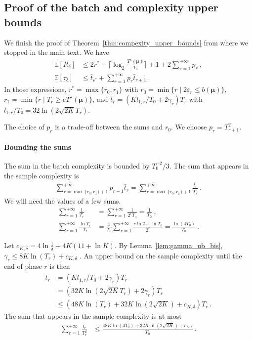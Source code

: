 \subsection{Proof of the batch and complexity upper bounds}

We finish the proof of Theorem~\ref{thm:compexity_upper_bounds} from where we stopped in the main text. We have
\begin{align*}
\mathbb{E}\left[R_\delta\right]
&\le 2r^* - \lceil \log_2 \frac{T^\star(\bm\mu)}{T_0} \rceil + 1 + 2\sum_{r = 1}^{+\infty} p_r
\: , \\
\mathbb{E}\left[\tau_\delta\right]
&\le \bar{t}_{r^*} + \sum_{r = 1}^{+\infty} p_{r} \bar{t}_{r+1}
\: .
\end{align*}
In those expressions, $r^* = \max\{r_0, r_1\}$ with $r_0 = \min\{r \mid 2 \varepsilon_r \le b(\bm\mu)\}$, $r_1 =  \min \{r \mid T_r \ge e T^\star(\bm\mu)\}$, and
$\bar{t}_r = (K l_{1,r}/T_0 + 2 \gamma_r) T_r$ with $l_{1,r}/T_0 = 32 \ln(2 \sqrt{2K} T_r)$.

The choice of $p_r$ is a trade-off between the sums and $r_0$. We choose $p_r = T_{r+1}^2$.

\paragraph{Bounding the sums}
The sum in the batch complexity is bounded by $T_0^{-2}/3$.
The sum that appears in the sample complexity is
\begin{align*}
\sum_{r = \max\{r_0, r_1\}+1}^{+\infty} p_{r-1} \bar{t}_r
= \sum_{r = \max\{r_0, r_1\}+1}^{+\infty} \frac{\bar{t}_r}{T_r^2}
\: .
\end{align*}
We will need the values of a few sums.
\begin{align*}
\sum_{r=1}^{+\infty} \frac{1}{T_r}
&= \sum_{r=1}^{+\infty} \frac{1}{2^r T_0}
= \frac{1}{T_0}
\: , \\
\sum_{r=1}^{+\infty} \frac{\ln T_r}{T_r}
&= \frac{1}{T_0} \sum_{r=1}^{+\infty} \frac{r \ln2 + \ln T_0}{2^r}
= \frac{\ln (4T_0)}{T_0}
\: .
\end{align*}

Let $c_{K,\delta} = 4 \ln \frac{1}{\delta} + 4K (11 + \ln K)$.
By Lemma~\ref{lem:gamma_ub_bis}, $\gamma_r \le 8K \ln(T_r) + c_{K,\delta}$ .
An upper bound on the sample complexity until the end of phase $r$ is then
\begin{align*}
\bar{t}_r
&= (K l_{1,r}/T_0 + 2\gamma_r) T_r
\\
&= (32 K \ln(2\sqrt{2K}T_r) + 2 \gamma_r) T_r
\\
&\le (48 K \ln(T_r) + 32 K \ln(2\sqrt{2K}) + c_{K,\delta})T_r
\: .
\end{align*}
The sum that appears in the sample complexity is at most
\begin{align*}
\sum_{r = 1}^{+\infty} \frac{\bar{t}_r}{T_r^2}	
&\le \frac{48 K \ln(4T_0) + 32 K \ln(2\sqrt{2K}) + c_{K,\delta}}{T_0}
\: .
\end{align*}

